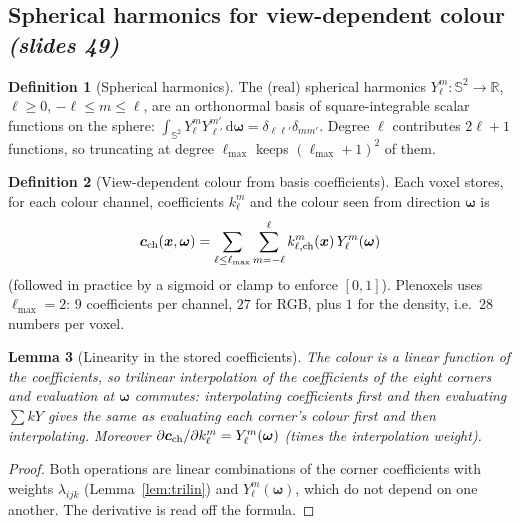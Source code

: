 \documentclass[11pt,a4paper]{article}
\newcommand{\sref}[1]{\texorpdfstring{\emph{(slides #1)}}{(slides #1)}}
\newcommand{\R}{\mathbb{R}}
\newcommand{\dif}{\,\mathrm{d}}
\newcommand{\om}{\boldsymbol{\omega}}
\newcommand{\cc}{\boldsymbol{c}}
\newcommand{\xx}{\boldsymbol{x}}
\theoremstyle{definition}
\newtheorem{definition}{Definition}[section]
\theoremstyle{plain}
\newtheorem{lemma}[definition]{Lemma}
\theoremstyle{remark}
\begin{document}
\subsection{Spherical harmonics for view-dependent colour \sref{49}}

\begin{definition}[Spherical harmonics]
The (real) spherical harmonics $Y_\ell^m:\mathbb S^2\to\R$, $\ell\ge0$, $-\ell\le m\le\ell$, are an orthonormal basis of square-integrable scalar functions on the sphere: $\int_{\mathbb S^2}Y_\ell^mY_{\ell'}^{m'}\dif\om=\delta_{\ell\ell'}\delta_{mm'}$. Degree $\ell$ contributes $2\ell+1$ functions, so truncating at degree $\ell_{\max}$ keeps $(\ell_{\max}+1)^2$ of them.
\end{definition}

\begin{definition}[View-dependent colour from basis coefficients]
Each voxel stores, for each colour channel, coefficients $k_\ell^m$ and the colour seen from direction $\om$ is
\[
\cc_{\rm ch}(\xx,\om)=\sum_{\ell\le\ell_{\max}}\sum_{m=-\ell}^{\ell}k_{\ell,{\rm ch}}^m(\xx)\,Y_\ell^m(\om)
\]
(followed in practice by a sigmoid or clamp to enforce $[0,1]$). Plenoxels uses $\ell_{\max}=2$: $9$ coefficients per channel, $27$ for RGB, plus $1$ for the density, i.e.\ $28$ numbers per voxel.
\end{definition}

\begin{lemma}[Linearity in the stored coefficients]\label{lem:sh}
The colour is a linear function of the coefficients, so trilinear interpolation of the coefficients of the eight corners and evaluation at $\om$ commutes: interpolating coefficients first and then evaluating $\sum kY$ gives the same as evaluating each corner's colour first and then interpolating. Moreover $\partial\cc_{\rm ch}/\partial k_\ell^m=Y_\ell^m(\om)$ (times the interpolation weight).
\end{lemma}
\begin{proof}
Both operations are linear combinations of the corner coefficients with weights $\lambda_{ijk}$ (Lemma~\ref{lem:trilin}) and $Y_\ell^m(\om)$, which do not depend on one another. The derivative is read off the formula.
\end{proof}
\end{document}
